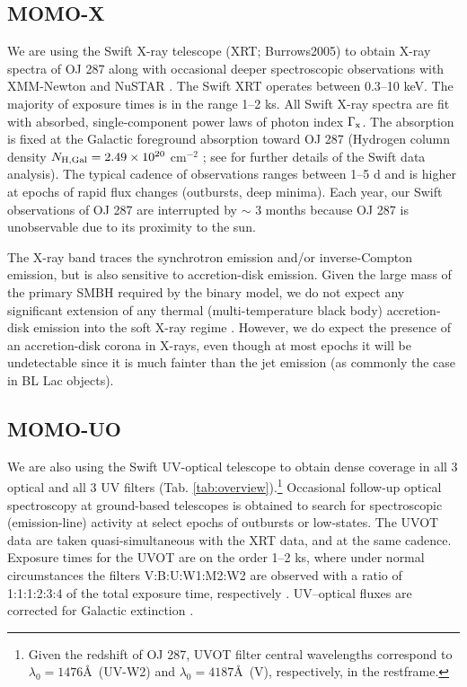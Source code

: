 \documentclass[preprints,article,accept,moreauthors,pdftex]{Definitions/mdpi}
\begin{document}
\subsection{MOMO-X}

We are using the Swift X-ray telescope (XRT; Burrows2005) to obtain  X-ray spectra of OJ 287 
along with occasional deeper spectroscopic observations with XMM-Newton and NuSTAR \citep{Komossa2020}. The Swift XRT operates between 0.3--10 keV. The majority of exposure times is in the range 1--2 ks. 
All Swift X-ray spectra are fit with absorbed, single-component power laws of photon index $\Gamma_{\rm x}$. The absorption is fixed at the Galactic foreground absorption toward OJ 287 (Hydrogen column density $N_{\rm H,Gal} = 2.49 \times 10^{20}$ cm$^{-2}$ \citep{Kalberla2005}; see \citep{Komossa2020} for further details of the Swift data analysis). 
The typical cadence of observations ranges between 1--5 d and is higher at epochs of rapid flux changes (outbursts, deep minima). Each year, our Swift observations of OJ 287 are interrupted by $\sim$ 3 months because OJ 287 is unobservable due to its proximity to the sun. 

The X-ray band traces the synchrotron emission and/or inverse-Compton emission, but is also sensitive to accretion-disk emission. Given the large mass of the primary SMBH required by the binary model, we do not expect any significant extension of any thermal (multi-temperature black body) accretion-disk emission into the soft X-ray regime \citep{Done2012}. However, we do expect the presence of an accretion-disk corona in X-rays, even though at most epochs it will be undetectable since it is much fainter than the jet emission (as commonly the case in BL Lac objects).    

\subsection{MOMO-UO}

We are also using the Swift UV-optical telescope \citep[UVOT;][]{Roming2005} to obtain dense coverage in all 3 optical and all 3 UV filters (Tab. \ref{tab:overview}).{\footnote{Given the redshift of OJ 287, UVOT filter central wavelengths \citep{Poole2008} correspond to $\lambda_{0}=1476$\AA ~(UV-W2) and $\lambda_{0}=4187$\AA ~(V), respectively, in the restframe.}}
Occasional follow-up optical spectroscopy at ground-based telescopes is obtained to search for spectroscopic (emission-line) activity at select epochs of outbursts or low-states.   
The UVOT data are taken quasi-simultaneous with the XRT data, and at the same cadence. Exposure times for the UVOT are on the order 1--2 ks, where under normal circumstances the filters V:B:U:W1:M2:W2 are observed with a ratio of 1:1:1:2:3:4 of the total exposure time, respectively \citep{Grupe2010}. UV--optical fluxes are corrected for Galactic extinction \citep{Schlegel1998}. 
\end{document}
